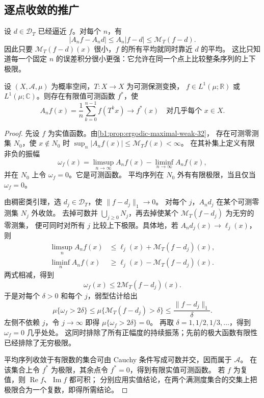 \subsection{逐点收敛的推广}
\label{b1:subsec:320304}

设 \(d\in\mathcal D_T\) 已经逼近 \(f\)。对每个 \(n\)，有
\[
 |A_nf-A_nd|\leq A_n|f-d|\leq\mathcal M_T(f-d).
\]
因此只要 \(\mathcal M_T(f-d)(x)\) 很小，\(f\) 的所有平均就同时靠近 \(d\) 的平均。
这比只知道每一个固定 \(n\) 的误差积分很小更强：它允许在同一个点上比较整条序列的上下极限。

\begin{theorem}[遍历平均的逐点收敛]
\label{b1:thm:ergodic-pointwise-32}
设 \((X,\mathcal A,\mu)\) 为概率空间，\(T:X\to X\) 为可测保测变换，
\(f\in L^1(\mu;\mathbb R)\) 或 \(L^1(\mu;\mathbb C)\)。则存在有限值可测函数 \(f^*\)，使
\[
 A_nf(x)=\frac1n\sum_{k=0}^{n-1}f(T^kx)\longrightarrow f^*(x)
 \quad\text{对几乎每个 }x\in X.
\]
\end{theorem}
\begin{proof}
先设 \(f\) 为实值函数。由\cref{b1:prop:ergodic-maximal-weak-32}，
存在可测零测集 \(N_0\)，使 \(x\notin N_0\) 时
\(\sup_n|A_nf(x)|\leq\mathcal M_Tf(x)<\infty\)。
在其补集上定义有限非负的振幅
\[
 \omega_f(x)=\limsup_{n\to\infty}A_nf(x)
                 -\liminf_{n\to\infty}A_nf(x),
\]
并在 \(N_0\) 上令 \(\omega_f=0\)。它是可测函数。
平均序列在 \(N_0\) 外有有限极限，当且仅当 \(\omega_f=0\)。

由稠密类引理，选 \(d_j\in\mathcal D_T\)，使 \(\|f-d_j\|_1\to0\)。
对每个 \(j\)，\(A_nd_j\) 在某个可测零测集 \(N_j\) 外收敛。
去掉可数并 \(\bigcup_{j\geq0}N_j\)，再去掉使某个 \(\mathcal M_T(f-d_j)\) 为无穷的零测集，
便可同时对所有 \(j\) 比较上下极限。具体地，若 \(A_nd_j(x)\to\ell_j(x)\)，则
\[
 \begin{aligned}
 \limsup_n A_nf(x)&\leq\ell_j(x)+\mathcal M_T(f-d_j)(x),\\
 \liminf_n A_nf(x)&\geq\ell_j(x)-\mathcal M_T(f-d_j)(x).
 \end{aligned}
\]
两式相减，得到
\[
 \omega_f(x)\leq2\mathcal M_T(f-d_j)(x).
\]
于是对每个 \(\delta>0\) 和每个 \(j\)，弱型估计给出
\[
 \mu\{\omega_f>2\delta\}
 \leq\mu\{\mathcal M_T(f-d_j)>\delta\}
 \leq\frac{\|f-d_j\|_1}{\delta}.
\]
左侧不依赖 \(j\)，令 \(j\to\infty\) 即得 \(\mu\{\omega_f>2\delta\}=0\)。
再取 \(\delta=1,1/2,1/3,\ldots\)，得到 \(\omega_f=0\) 几乎处处。
这同时排除了所有正幅度的持续振荡；先前的极大函数有限性已经排除了无穷极限。

平均序列收敛于有限数的集合可由 Cauchy 条件写成可数并交，因而属于 \(\mathcal A\)。
在该集合上令 \(f^*\) 为极限，其余点令 \(f^*=0\)，得到有限实值可测函数。
若 \(f\) 为复值，则 \(\operatorname{Re}f\)、\(\operatorname{Im}f\) 都可积；
分别应用实值结论，在两个满测度集合的交集上把极限合为一个复数，即得所需结论。
\end{proof}

